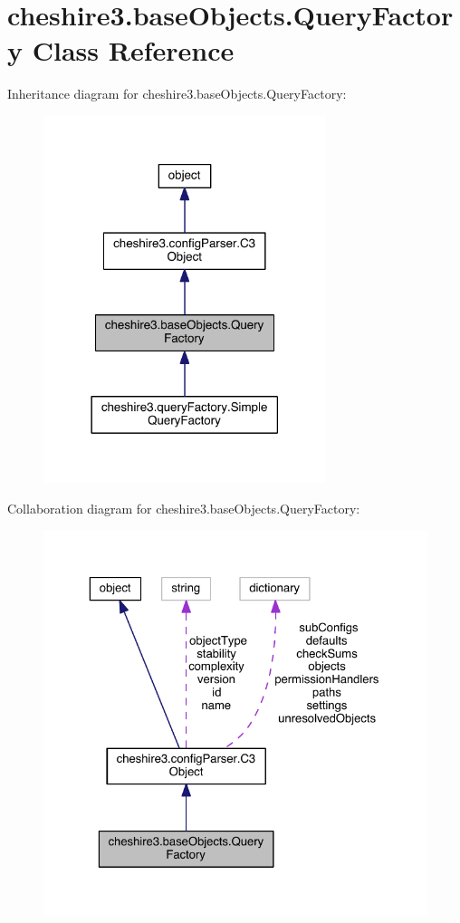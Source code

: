 \hypertarget{classcheshire3_1_1base_objects_1_1_query_factory}{\section{cheshire3.\-base\-Objects.\-Query\-Factory Class Reference}
\label{classcheshire3_1_1base_objects_1_1_query_factory}
}


Inheritance diagram for cheshire3.\-base\-Objects.\-Query\-Factory\-:
\nopagebreak
\begin{figure}[H]
\begin{center}
\leavevmode
\includegraphics[width=234pt]{classcheshire3_1_1base_objects_1_1_query_factory__inherit__graph}
\end{center}
\end{figure}


Collaboration diagram for cheshire3.\-base\-Objects.\-Query\-Factory\-:
\nopagebreak
\begin{figure}[H]
\begin{center}
\leavevmode
\includegraphics[width=325pt]{classcheshire3_1_1base_objects_1_1_query_factory__coll__graph}
\end{center}
\end{figure}
